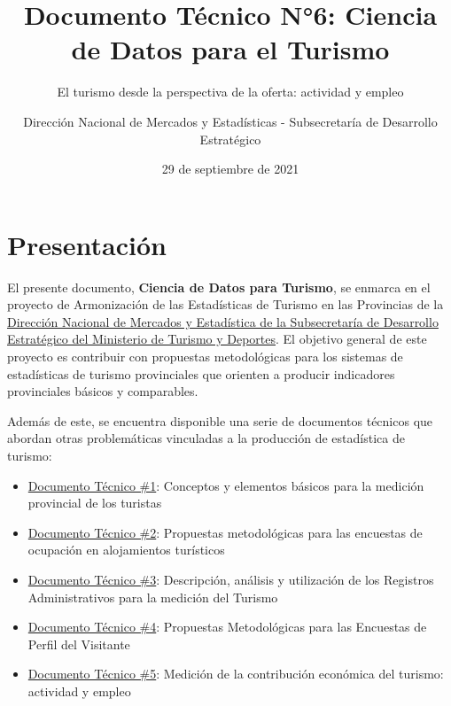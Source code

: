 \documentclass[
  openany]{book}
\title{Documento Técnico N°6: Ciencia de Datos para el Turismo}
\subtitle{El turismo desde la perspectiva de la oferta: actividad y empleo}
\author{Dirección Nacional de Mercados y Estadísticas - Subsecretaría de Desarrollo Estratégico}
\date{29 de septiembre de 2021}
\let\oldmaketitle\maketitle
\begin{document}
\maketitle


\newpage

\let\maketitle\oldmaketitle
\maketitle

{
\setcounter{tocdepth}{1}
\tableofcontents
}
\hypertarget{presentaciuxf3n}{%
\chapter*{Presentación}\label{presentaciuxf3n}}

El presente documento, \textbf{Ciencia de Datos para Turismo}, se enmarca en el proyecto de Armonización de las Estadísticas de Turismo en las Provincias de la \href{https://www.yvera.tur.ar/estadistica/}{Dirección Nacional de Mercados y Estadística de la Subsecretaría de Desarrollo Estratégico del Ministerio de Turismo y Deportes}. El objetivo general de este proyecto es contribuir con propuestas metodológicas para los sistemas de estadísticas de turismo provinciales que orienten a producir indicadores provinciales básicos y comparables.

Además de este, se encuentra disponible una serie de documentos técnicos que abordan otras problemáticas vinculadas a la producción de estadística de turismo:

\begin{itemize}
\item
  \href{https://dnme-minturdep.github.io/DT1_medicion_turismo/}{Documento Técnico \#1}: Conceptos y elementos básicos para la medición provincial de los turistas
\item
  \href{https://dnme-minturdep.github.io/DT2_encuestas/}{Documento Técnico \#2}: Propuestas metodológicas para las encuestas de ocupación en alojamientos turísticos
\item
  \href{https://dnme-minturdep.github.io/DT3_registros_adminsitrativos/}{Documento Técnico \#3}: Descripción, análisis y utilización de los Registros Administrativos para la medición del Turismo
\item
  \href{https://dnme-minturdep.github.io/DT4_perfiles/}{Documento Técnico \#4}: Propuestas Metodológicas para las Encuestas de Perfil del Visitante
\item
  \href{https://dnme-minturdep.github.io/DT5_actividad_empleo/}{Documento Técnico \#5}: Medición de la contribución económica del turismo: actividad y empleo
\end{itemize}
\end{document}
